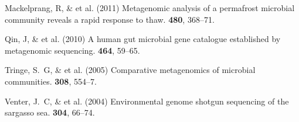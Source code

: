 \documentclass{pnastwo}
\begin{document}
\begin{article}
\begin{thebibliography}{10}


 Mackelprang, R, \& et al.
\newblock (2011) Metagenomic analysis of a permafrost microbial community
reveals a rapid response to thaw.  {\bf 480}, 368--71.


 Qin, J, \& et al. \newblock
(2010) A human gut microbial gene catalogue established by metagenomic
sequencing.  {\bf 464}, 59--65.
%


 Tringe, S.~G, \& et al. \newblock (2005) Comparative
metagenomics of microbial communities.  {\bf 308},
554--7.
%
%


 Venter, J.~C, \& et al. \newblock (2004) Environmental genome shotgun sequencing of the sargasso
sea.  {\bf 304}, 66--74.
%


\end{thebibliography}
\end{article}
\end{document}
